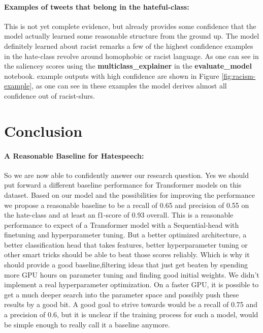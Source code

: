\documentclass[11pt,a4paper]{article}
\begin{document}
\paragraph{Examples of tweets that belong in the hateful-class:}
\begin{center}
\newline
\end{center}

This is not yet complete evidence, but already provides some confidence that the model actually learned some reasonable structure from the ground up.
The model definitely learned about racist remarks a few of the highest confidence examples in the hate-class revolve around homophobic or racist language.
As one can see in the saliencey scores using the \textbf{multiclass\_explainer} in the \textbf{evaluate\_model} notebook.
example outputs with high confidence are shown in Figure \ref{fig:racism-example},
as one can see in these examples the model derives almost all confidence out of racist-slurs.


\section{Conclusion}
\paragraph{A Reasonable Baseline for Hatespeech:}
So we are now able to confidently answer our research question.
Yes we should put forward a different baseline performance for Transformer models on this dataset.
Based on our model and the possibilities for improving the performance we propose a reasonable baseline to be 
a recall of 0.65 and precision of 0.55 on the hate-class and at least an f1-score of 0.93 overall.
This is a reasonable performance to expect of a Transformer model with a Sequential-head with finetuning
and hyperparameter tuning.
But a better optimized architecture, a better classification head that takes features, better hyperparameter tuning or other smart tricks
should be able to beat those scores reliably.
Which is why it should provide a good baseline,filtering ideas that just get beaten by spending more GPU hours on parameter tuning and finding good initial weights.
We didn't implement a real hyperparameter optimization.
On a faster GPU, it is possible to get a much deeper search into the parameter space and possibly push these results by a good bit.
A good goal to strive towards would be a recall of 0.75 and a precision of 0.6, but it is unclear if the training process for such a model, would 
be simple enough to really call it a baseline anymore.
\end{document}
